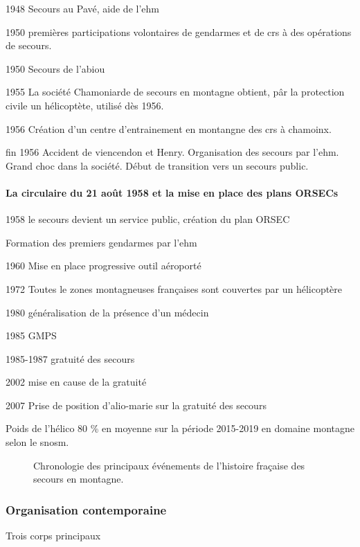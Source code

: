 1948 Secours au Pavé, aide de l'\ac{ehm}

1950 premières participations volontaires de gendarmes et de crs à des
opérations de secours.

1950 Secours de l'abiou

1955 La société Chamoniarde de secours en montagne obtient, pâr la
protection civile un hélicoptète, utilisé dès 1956.

1956 Création d'un centre d'entrainement en montangne des crs à
chamoinx.

fin 1956 Accident de viencendon et Henry. Organisation des secours par
l'ehm. Grand choc dans la société. Début de transition vers un secours
public.


\paragraph{La circulaire du 21 août 1958 et la mise en place des plans ORSECs}
\label{par:1-1-1-1-2}

1958 le secours devient un service public, création du plan ORSEC

Formation des premiers gendarmes par l'ehm

1960 Mise en place progressive outil aéroporté

1972 Toutes le zones montagneuses françaises sont couvertes par un
hélicoptère

1980 généralisation de la présence d'un médecin

1985 GMPS

1985-1987 gratuité des secours

2002 mise en cause de la gratuité

2007 Prise de position d'alio-marie sur la gratuité des secours

Poids de l'hélico 80 \% en moyenne sur la période 2015-2019 en domaine
montagne selon le \ac{snosm}.

\begin{figure}
  \centering
   
   \caption{Chronologie des principaux événements de
     l'histoire fraçaise des secours en montagne.}
  \label{fig:frise_chronologique}
\end{figure}


\subsubsection{Organisation contemporaine}
\label{subsubsec:1-1-1-2}

Trois corps principaux

